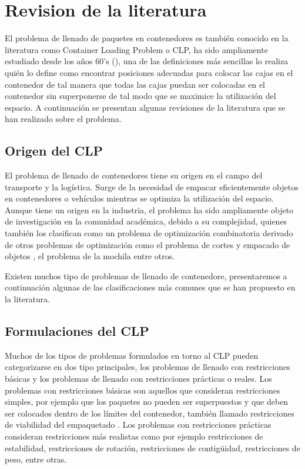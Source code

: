 
\section{Revision de la literatura}

El problema de llenado de paquetes en contenedores es también conocido en la literatura como Container Loading Problem o CLP, ha sido ampliamente estudiado desde los años 60's (\textcite{barnett1967exact}), una de las definiciones más sencillas lo realiza \textcite{GEORGE1980147} quién lo define como encontrar posiciones adecuadas para colocar las cajas en el contenedor de tal manera que todas las cajas puedan ser colocadas en el contenedor sin superponerse de tal modo que se maximice la utilización del espacio. A continuación se presentan algunas revisiones de la literatura que se han realizado sobre el problema.

\subsection{Origen del CLP}

El problema de llenado de contenedores tiene su origen en el campo del transporte y la logística. Surge de la necesidad de empacar eficientemente objetos en contenedores o vehículos mientras se optimiza la utilización del espacio. Aunque tiene un origen en la industria, el problema ha sido ampliamente objeto de investigación en la comunidad académica, debido a su complejidad, quienes también los clasifican como un problema de optimización combinatoria derivado de otros problemas de optimización como el problema de cortes y empacado de objetos \textcite{Alvarez-Valdes2018}, el problema de la mochila \textcite{DEQUEIROZ2012200} entre otros.

Existen muchos tipo de problemas de llenado de contenedore, presentaremos a continuación algunas de las clasificaciones más comunes que se han propuesto en la literatura.

\subsection{Formulaciones del CLP}

Muchos de los tipos de problemas formulados en torno al CLP pueden categorizarse en dos tipo principales, los problemas de llenado con restricciones básicas y los problemas de llenado con restricciones prácticas o reales. Los problemas con restricciones básicas son aquellos que consideran restricciones simples, por ejemplo que los paquetes no pueden ser superpuestos y que deben ser colocados dentro de los límites del contenedor, también llamado restricciones de viabilidad del empaquetado \textcite{scheithauer2017introduction}. Los problemas con restricciones prácticas consideran restricciones más realistas como por ejemplo restricciones de estabilidad, restricciones de rotación, restricciones de contigüidad, restricciones de peso, entre otras. 

